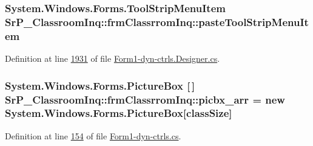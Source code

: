 \hypertarget{class_sr_p___classroom_inq_1_1frm_classrrom_inq_a6cd3b1f68a59b97544531e749b77e868}{
\subsubsection[{paste\-Tool\-Strip\-Menu\-Item}]{\setlength{\rightskip}{0pt plus 5cm}\-System.\-Windows.\-Forms.\-Tool\-Strip\-Menu\-Item {\bf \-Sr\-P\-\_\-\-Classroom\-Inq\-::frm\-Classrrom\-Inq\-::paste\-Tool\-Strip\-Menu\-Item}}}
\label{class_sr_p___classroom_inq_1_1frm_classrrom_inq_a6cd3b1f68a59b97544531e749b77e868}


\-Definition at line \hyperlink{_form1-dyn-ctrls_8_designer_8cs_source_l01931}{1931} of file \hyperlink{_form1-dyn-ctrls_8_designer_8cs_source}{\-Form1-\/dyn-\/ctrls.\-Designer.\-cs}.

\hypertarget{class_sr_p___classroom_inq_1_1frm_classrrom_inq_a067a85853fc3e38cf6343917c4fb061a}{
\subsubsection[{picbx\-\_\-arr}]{\setlength{\rightskip}{0pt plus 5cm}\-System.\-Windows.\-Forms.\-Picture\-Box \mbox{[}$\,$\mbox{]} {\bf \-Sr\-P\-\_\-\-Classroom\-Inq\-::frm\-Classrrom\-Inq\-::picbx\-\_\-arr} = new \-System.\-Windows.\-Forms.\-Picture\-Box\mbox{[}{\bf class\-Size}\mbox{]}}}
\label{class_sr_p___classroom_inq_1_1frm_classrrom_inq_a067a85853fc3e38cf6343917c4fb061a}


\-Definition at line \hyperlink{_form1-dyn-ctrls_8cs_source_l00154}{154} of file \hyperlink{_form1-dyn-ctrls_8cs_source}{\-Form1-\/dyn-\/ctrls.\-cs}.

